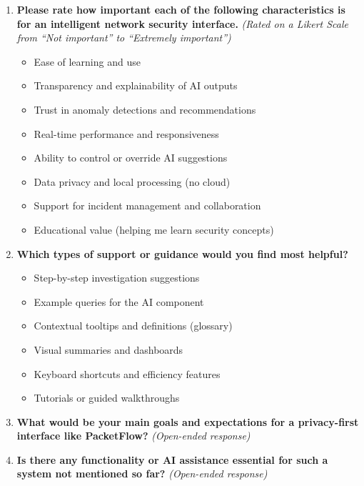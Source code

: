 \documentclass[
    11pt, 
    a4paper, 
    parskip=half, 
    headsepline,       %
    DIV=12             %
]{scrartcl}
\begin{document}
\begin{enumerate}[label=\textbf{\arabic*.}]
    \item \textbf{Please rate how important each of the following characteristics is for an intelligent network security interface.}
    \newline \textit{(Rated on a Likert Scale from ``Not important'' to ``Extremely important'')}
    \begin{itemize}[label=$\circ$, nosep]
        \item Ease of learning and use
        \item Transparency and explainability of AI outputs
        \item Trust in anomaly detections and recommendations
        \item Real-time performance and responsiveness
        \item Ability to control or override AI suggestions
        \item Data privacy and local processing (no cloud)
        \item Support for incident management and collaboration
        \item Educational value (helping me learn security concepts)
    \end{itemize}

    \item \textbf{Which types of support or guidance would you find most helpful?}
    \begin{itemize}[label=$\circ$, nosep]
        \item Step-by-step investigation suggestions
        \item Example queries for the AI component
        \item Contextual tooltips and definitions (glossary)
        \item Visual summaries and dashboards
        \item Keyboard shortcuts and efficiency features
        \item Tutorials or guided walkthroughs
    \end{itemize}

    \item \textbf{What would be your main goals and expectations for a privacy-first interface like PacketFlow?}
    \newline \textit{(Open-ended response)}

    \item \textbf{Is there any functionality or AI assistance essential for such a system not mentioned so far?}
    \newline \textit{(Open-ended response)}

\end{enumerate}
\end{document}
